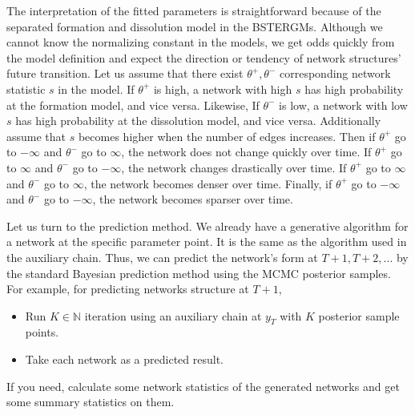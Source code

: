 \documentclass[a4paper, 11pt]{report}
\theoremstyle{definition}
\begin{document}
The interpretation of the fitted parameters is straightforward because of the separated formation and dissolution model in the BSTERGMs.
Although we cannot know the normalizing constant in the models, we get odds quickly from the model definition and
expect the direction or tendency of network structures' future transition.
Let us assume that there exist $\theta^+, \theta^-$ corresponding network statistic $s$ in the model.
If $\theta^+$ is high, a network with high $s$ has high probability at the formation model, and vice versa.
Likewise, If $\theta^-$ is low, a network with low $s$ has high probability at the dissolution model, and vice versa.
Additionally assume that $s$ becomes higher when the number of edges increases.
Then if $\theta^+$ go to $-\infty$ and $\theta^-$ go to $\infty$, the network does not change quickly over time.
If $\theta^+$ go to $\infty$ and $\theta^-$ go to $-\infty$, the network changes drastically over time.
If $\theta^+$ go to $\infty$ and $\theta^-$ go to $\infty$, the network becomes denser over time.
Finally, if $\theta^+$ go to $-\infty$ and $\theta^-$ go to $-\infty$, the network becomes sparser over time.

Let us turn to the prediction method. We already have a generative algorithm for a network at the specific parameter point.
It is the same as the algorithm used in the auxiliary chain.
Thus, we can predict the network's form at $T+1,T+2,...$ by the standard Bayesian prediction method using the MCMC posterior samples.
For example, for predicting networks structure at $T+1$,
\begin{itemize}
    \item Run $K\in \mathbb{N}$ iteration using an auxiliary chain at $y_T$ with $K$ posterior sample points.
    \item Take each network as a predicted result.
\end{itemize}
If you need, calculate some network statistics of the generated networks and get some summary statistics on them.
\end{document}
